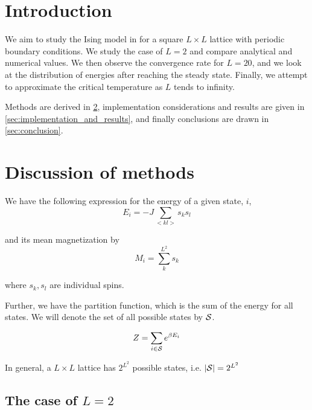 \documentclass[a4paper]{article}
\begin{document}
\section{Introduction}\label{sec:intro}

We aim to study the Ising model in for a square $L \times L$ lattice with periodic boundary conditions. We study the case of $L=2$ and compare analytical and numerical values. We then observe the convergence rate for $L=20$, and we look at the distribution of energies after reaching the steady state. Finally, we attempt to approximate the critical temperature as $L$ tends to infinity.


Methods are derived in \ref{sec:methods}, implementation considerations and results are given in \ref{sec:implementation_and_results}, and finally conclusions are drawn in \ref{sec:conclusion}.



\section{Discussion of methods}\label{sec:methods}
We have the following expression for the energy of a given state, $i$,
\begin{equation}
    E_i=-J\sum_{< kl >}s_k s_l
\end{equation}

and its mean magnetization by
\begin{equation}
    M_i=\sum_{k}^{L^2} s_k
\end{equation}

where $s_k, s_l$ are individual spins.

Further, we have the partition function, which is the sum of the energy for all states. We will denote the set of all possible states by ${\mathcal{S}}$.

\begin{equation}
    Z = \sum_{i \in {\mathcal{S}}}e^{\beta E_i}
\end{equation}

In general, a $L \times L$ lattice has $2^{L^2}$ possible states, i.e. $|{\mathcal{S}}| = 2^{L^2}$

\subsection{The case of $L = 2$}
\end{document}
